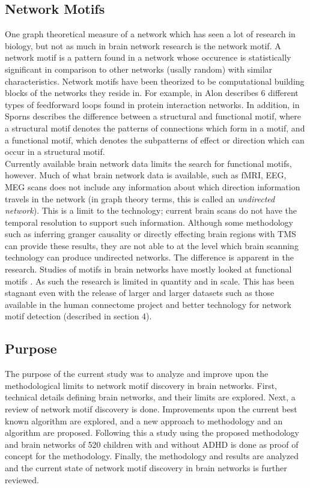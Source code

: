\subsection{Network Motifs}
One graph theoretical measure of a network which has seen a lot of research in biology, but not as much in brain network research is the network motif. A network motif is a pattern found in a network whose occurence is statistically significant in comparison to other networks (usally random) with similar characteristics. Network motifs have been theorized to be computational building blocks of the networks they reside in. For example, in \cite{alon07} Alon describes 6 different types of feedforward loops found in protein interaction networks. In addition, in \cite{sporns04} Sporns describes the difference between a structural and functional motif, where a structural motif denotes the patterns of connections which form in a motif, and a functional motif, which denotes the subpatterns of effect or direction which can occur in a structural motif.\\
Currently available brain network data limits the search for functional motifs, however. Much of what brain network data is available, such as fMRI, EEG, MEG scans does not include any information about which direction information travels in the network (in graph theory terms, this is called an \textit{undirected network}). This is a limit to the technology; current brain scans do not have the temporal resolution to support such information. Although some methodology such as inferring granger causality or directly effecting brain regions with TMS can provide these results, they are not able to at the level which brain scanning technology can produce undirected networks. 
The difference is apparent in the research. Studies of motifs in brain networks have mostly looked at functional motifs \cite[p.107]{sporns10}. As such the research is limited in quantity and in scale. This has been stagnant even with the release of larger and larger datasets such as those available in the human connectome project \cite{biswal2010} and better technology for network motif detection (described in section 4).\\
\subsection{Purpose}
The purpose of the current study was to analyze and improve upon the methodological limits to network motif discovery in brain networks. First, technical details defining brain networks, and their limits are explored. Next, a review of network motif discovery is done. Improvements upon the current best known algorithm are explored, and a new approach to methodology and an algorithm are proposed. Following this a study using the proposed methodology and brain networks of 520 children with and without ADHD is done as proof of concept for the methodology. Finally, the methodology and results are analyzed and the current state of network motif discovery in brain networks is further reviewed. 